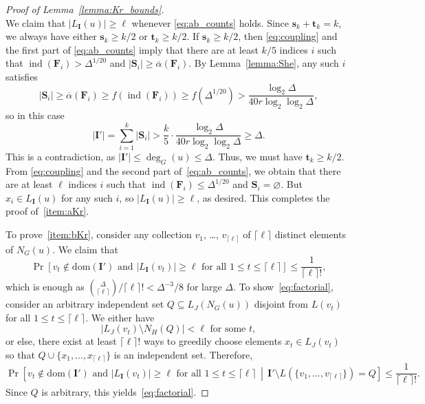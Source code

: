 \documentclass[11pt, reqno, psamsfonts]{amsart}
\theoremstyle{definition}
\theoremstyle{remark}
\newcommand{\0}{\varnothing}
\newcommand{\set}[1]{\{#1\}}
\newcommand{\dom}{\mathrm{dom}}
\renewcommand{\leq}{\leqslant}
\renewcommand{\geq}{\geqslant}
\renewcommand{\mathbf}[1]{{\bm{#1}}}
\numberwithin{equation}{section}
\begin{document}
\begin{proof}[Proof of Lemma~\ref{lemma:Kr_bounds}]
\begin{equation}
		\end{equation}
		We claim that $|L_\mathbf{I}(u)| \geq \ell$ whenever \eqref{eq:ab_counts} holds. Since $\mathbf{s}_k + \mathbf{t}_k = k$, we always have either $\mathbf{s}_k \geq k/2$ or $\mathbf{t}_k \geq k/2$. If $\mathbf{s}_k \geq k/2$, then \eqref{eq:coupling} and the first part of \eqref{eq:ab_counts} imply that there are at least $k/5$ indices $i$ such that $\operatorname{ind}(\mathbf{F}_i) > \Delta^{1/20}$ and $|\mathbf{S}_i| \geq \overline{\alpha}(\mathbf{F}_i)$. By Lemma~\ref{lemma:She}, any such $i$ satisfies
		\[
			|\mathbf{S}_i| \geq \overline{\alpha}(\mathbf{F}_i) \geq f(\operatorname{ind}(\mathbf{F}_i)) \geq f(\Delta^{1/20}) > \frac{\log_2 \Delta}{40r \log_2 \log_2 \Delta},
		\]
		so in this case
		\[
			|\mathbf{I}'| = \sum_{i = 1}^k |\mathbf{S}_i| > \frac{k}{5} \cdot \frac{\log_2 \Delta}{40r \log_2 \log_2 \Delta} \geq \Delta.
		\]
		This is a contradiction, as $|\mathbf{I}'| \leq \deg_G(u) \leq \Delta$. Thus, we must have $\mathbf{t}_k \geq k/2$. From \eqref{eq:coupling} and the second part of~\eqref{eq:ab_counts}, we obtain that there are at least $\ell$ indices $i$ such that $\operatorname{ind}(\mathbf{F}_i) \leq \Delta^{1/20}$ and $\mathbf{S}_i = \0$. But $x_i \in L_{\mathbf{I}}(u)$ for any such $i$, so $|L_\mathbf{I}(u)| \geq \ell$, as desired. This completes the proof of~\ref{item:aKr}.
		
		To prove~\ref{item:bKr}, consider any collection $v_1$, \ldots, $v_{\lceil \ell \rceil}$ of $\lceil \ell \rceil$ distinct elements of $N_G(u)$. We claim that
		\begin{equation}\label{eq:factorial}
			\Pr\left[v_t \not \in \dom(\mathbf{I}') \text{ and } |L_\mathbf{I}(v_t)| \geq \ell \text{ for all } 1 \leq t \leq \lceil \ell \rceil\right] \leq \frac{1}{\lceil \ell \rceil!},
		\end{equation}
		which is enough as ${\Delta \choose \lceil \ell \rceil}/\lceil \ell \rceil! < \Delta^{-3}/8$ for large $\Delta$. To show~\eqref{eq:factorial}, consider an arbitrary independent set $Q \subseteq L_J(N_G(u))$ disjoint from $L(v_t)$ for all $1 \leq t \leq \lceil\ell\rceil$. We either have \[|L_J(v_t) \setminus N_H(Q)| < \ell \text{ for some } t,\] or else, there exist at least $\lceil \ell \rceil!$ ways to greedily choose elements $x_t \in L_J(v_t)$ so that $Q \cup \set{x_1, \ldots, x_{\lceil \ell \rceil}}$ is an independent set. Therefore,
		\[
			\Pr\left[v_t \not \in \dom(\mathbf{I}') \text{ and } |L_\mathbf{I}(v_t)| \geq \ell \text{ for all } 1 \leq t \leq \lceil \ell \rceil \,\middle\vert\, \mathbf{I}'\setminus L(\set{v_1, \ldots, v_{\lceil \ell \rceil}}) = Q\right] \leq \frac{1}{\lceil \ell \rceil!}.
		\]
		Since $Q$ is arbitrary, this yields~\eqref{eq:factorial}.
	\end{proof}
	
\end{document}
